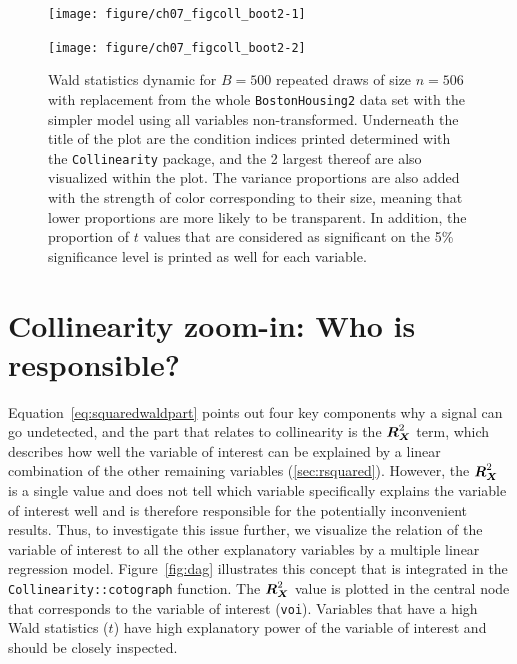 \documentclass[11pt,a4paper,twoside]{book}\usepackage[]{graphicx}\usepackage[]{xcolor}
\newenvironment{knitrout}{}{} %
\begin{document}
\newpage
\begin{figure}[H]%
\begin{center}
\begin{knitrout}
\color{fgcolor}
\texttt{[image: figure/ch07\_figcoll\_boot2-1]} 

\texttt{[image: figure/ch07\_figcoll\_boot2-2]} 
\end{knitrout}
\end{center}
\vspace*{-10mm}
\caption{Wald statistics dynamic for $B=500$ repeated draws of size $n=506$ with replacement from the whole \texttt{BostonHousing2} data set with the simpler model using all variables non-transformed. Underneath the title of the plot are the condition indices printed determined with the \texttt{Collinearity} package, and the 2 largest thereof are also visualized within the plot.
The variance proportions are also added with the strength of color corresponding to their size, meaning that lower proportions are more likely to be transparent. In addition, the proportion of $t$ values that are considered as significant on the 5\% significance level is printed as well for each variable.}
\label{fig:coll_boot2}
\end{figure}


\section{Collinearity zoom-in: Who is responsible?}

Equation~\eqref{eq:squaredwaldpart} points out four key components why a signal can go undetected, and the part that relates to collinearity is the ${\boldsymbol{R}}_{\boldsymbol{X}}^2$ term, which describes how well the variable of interest can be explained by a linear combination of the other remaining variables (\ref{sec:rsquared}). However, the ${\boldsymbol{R}}_{\boldsymbol{X}}^2$ is a single value and does not tell which variable specifically explains the variable of interest well and is therefore responsible for the potentially inconvenient results. Thus, to investigate this issue further, we visualize the relation of the variable of interest to all the other explanatory variables by a multiple linear regression model.
Figure~\ref{fig:dag} illustrates this concept that is integrated in the \texttt{Collinearity::cotograph} function.
The ${\boldsymbol{R}}_{\boldsymbol{X}}^2$ value is plotted in the central node that corresponds to the variable of interest (\texttt{voi}).
Variables that have a high Wald statistics ($t$) have high explanatory power of the variable of interest and should be closely inspected.
\end{document}
